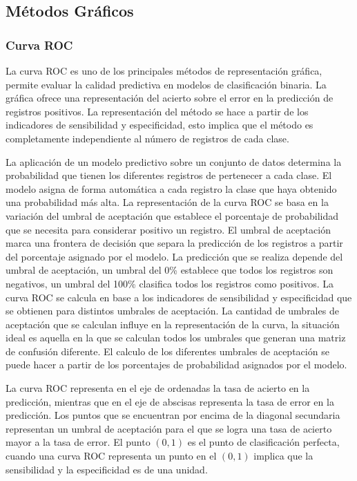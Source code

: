 \clearpage

\subsection{Métodos Gráficos}

\subsubsection{Curva ROC}

La curva ROC \cite{ROC2006} es uno de los principales métodos de representación gráfica, permite evaluar la calidad predictiva en modelos de clasificación binaria. La gráfica ofrece una representación del acierto sobre el error en la predicción de registros positivos. La representación del método se hace a partir de los indicadores de sensibilidad y especificidad, esto implica que el método es completamente independiente al número de registros de cada clase.

\bigbreak

La aplicación de un modelo predictivo sobre un conjunto de datos determina la probabilidad que tienen los diferentes registros de pertenecer a cada clase. El modelo asigna de forma automática a cada registro la clase que haya obtenido una probabilidad más alta. La representación de la curva ROC se basa en la variación del umbral de aceptación que establece el porcentaje de probabilidad que se necesita para considerar positivo un registro. El umbral de aceptación marca una frontera de decisión que separa la predicción de los registros a partir del porcentaje asignado por el modelo. La predicción que se realiza depende del umbral de aceptación, un umbral del 0\% establece que todos los registros son negativos, un umbral del 100\% clasifica todos los registros como positivos. La curva ROC se calcula en base a los indicadores de sensibilidad y especificidad que se obtienen para distintos umbrales de aceptación. La cantidad de umbrales de aceptación que se calculan influye en la representación de la curva, la situación ideal es aquella en la que se calculan todos los umbrales que generan una matriz de confusión diferente. El calculo de los diferentes umbrales de aceptación se puede hacer a partir de los porcentajes de probabilidad asignados por el modelo.

\bigbreak

La curva ROC representa en el eje de ordenadas la tasa de acierto en la predicción, mientras que en el eje de abscisas representa la tasa de error en la predicción. Los puntos que se encuentran por encima de la diagonal secundaria representan un umbral de aceptación para el que se logra una tasa de acierto mayor a la tasa de error. El punto $(0, 1)$ es el punto de clasificación perfecta, cuando una curva ROC representa un punto en el $(0, 1)$ implica que la sensibilidad y la especificidad es de una unidad. 

